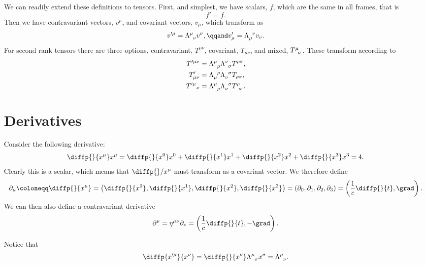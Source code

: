 We can readily extend these definitions to tensors.
First, and simplest, we have scalars, \(f\), which are the same in all frames, that is
\begin{equation}
    f' = f.
\end{equation}
Then we have contravariant vectors, \(v^\mu\), and covariant vectors, \(v_\mu\), which transform as
\begin{equation}
    v'^\mu = \tensor{\Lambda}{^\mu_\nu}v^\nu, \qqand v'_\mu = \tensor{\Lambda}{_\mu^\nu}v_\nu.
\end{equation}
For second rank tensors there are three options, contravariant, \(T^{\mu\nu}\), covariant, \(T_{\mu\nu}\), and mixed, \(\tensor{T}{^\mu_\nu}\).
These transform according to
\begin{align}
    T'^{\mu\nu} &= \tensor{\Lambda}{^\mu_\rho}\tensor{\Lambda}{^\nu_\sigma} T^{\rho\sigma},\\
    T'_{\mu\nu} &= \tensor{\Lambda}{_\mu^\rho}\tensor{\Lambda}{_\nu^\sigma} T_{\rho\sigma},\\
    {T'^\mu}_\nu &= \tensor{\Lambda}{^\mu_\rho}\tensor{\Lambda}{_\nu^\sigma} \tensor{T}{^\rho_\sigma}.
\end{align}

\section{Derivatives}
Consider the following derivative:
\begin{equation}
    \diffp{}{x^\mu}x^\mu = \diffp{}{x^0}x^0 + \diffp{}{x^1}x^1 + \diffp{}{x^2}x^2 + \diffp{}{x^3} x^3 = 4.
\end{equation}
Clearly this is a scalar, which means that \(\diffp{}/{x^\mu}\) must transform as a covariant vector.
We therefore define
\begin{equation}
    \partial_\mu \coloneqq \diffp{}{x^\mu} = \left( \diffp{}{x^0}, \diffp{}{x^1}, \diffp{}{x^2}, \diffp{}{x^3} \right) = (\partial_0, \partial_1, \partial_2, \partial_3) = \left( \frac{1}{c}\diffp{}{t}, \grad \right).
\end{equation}
We can then also define a contravariant derivative
\begin{equation}
    \partial^\mu = \eta^{\mu\nu}\partial_\nu = \left( \frac{1}{c} \diffp{}{t}, -\grad \right).
\end{equation}

Notice that
\begin{equation}
    \diffp{x'^\mu}{x^\nu} = \diffp{}{x^\nu} \tensor{\Lambda}{^\mu_\sigma}x^\sigma = \tensor{\Lambda}{^\mu_\nu}.
\end{equation}

